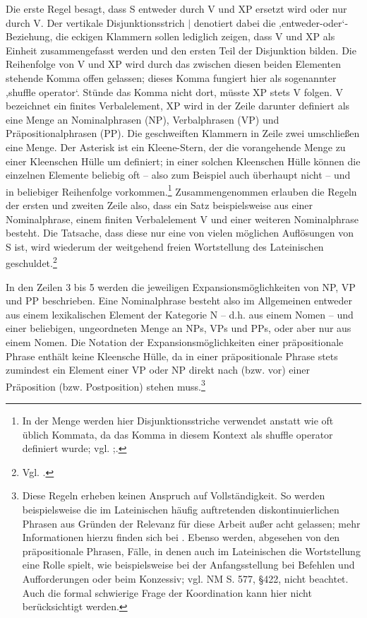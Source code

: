 \documentclass[12pt,a4paper]{article}
\begin{document}
Die erste Regel besagt, dass S entweder durch V und XP ersetzt wird oder nur durch V. Der vertikale Disjunktionsstrich $\mid$ denotiert dabei die ,entweder-oder‘-Beziehung, die eckigen Klammern sollen lediglich zeigen, dass V und XP als Einheit zusammengefasst werden und den ersten Teil der Disjunktion bilden. Die Reihenfolge von V und XP wird durch das zwischen diesen beiden Elementen stehende Komma offen gelassen; dieses Komma fungiert hier als sogenannter ,shuffle operator‘. Stünde das Komma nicht dort, müsste XP stets V folgen. V bezeichnet ein finites Verbalelement, XP wird in der Zeile darunter definiert als eine Menge an Nominalphrasen (NP), Verbalphrasen (VP) und Präpositionalphrasen (PP). Die geschweiften Klammern in Zeile zwei umschließen eine Menge. Der Asterisk ist ein Kleene-Stern, der die vorangehende Menge zu einer Kleenschen Hülle um definiert; in einer solchen Kleenschen Hülle können die einzelnen Elemente beliebig oft -- also zum Beispiel auch überhaupt nicht -- und in beliebiger Reihenfolge vorkommen.\footnote{In der Menge werden hier Disjunktionsstriche verwendet anstatt wie oft üblich Kommata, da das Komma in diesem Kontext als shuffle operator definiert wurde; vgl. \cite[26]{Skript};\cite[7??14??]{Snijders}.} Zusammengenommen erlauben die Regeln der ersten und zweiten Zeile also, dass ein Satz beispielsweise aus einer Nominalphrase, einem finiten Verbalelement V und einer weiteren Nominalphrase besteht. Die Tatsache, dass diese nur eine von vielen möglichen Auflösungen von S ist, wird wiederum der weitgehend freien Wortstellung des Lateinischen geschuldet.\footnote{Vgl. \cite[19]{Rohrer}.}

In den Zeilen 3 bis 5 werden die jeweiligen Expansionsmöglichkeiten von NP, VP und PP beschrieben. Eine Nominalphrase besteht also im Allgemeinen entweder aus einem lexikalischen Element der Kategorie N – d.h. aus einem Nomen -- und einer beliebigen, ungeordneten Menge an NPs, VPs und PPs, oder aber nur aus einem Nomen.  Die Notation der Expansionsmöglichkeiten einer präpositionale Phrase enthält keine Kleensche Hülle, da in einer präpositionale Phrase stets zumindest ein Element einer VP oder NP direkt nach (bzw. vor) einer Präposition (bzw. Postposition) stehen muss.\footnote{Diese Regeln erheben keinen Anspruch auf Vollständigkeit. So werden beispielsweise die im Lateinischen häufig auftretenden diskontinuierlichen Phrasen aus Gründen der Relevanz für diese Arbeit außer acht gelassen; mehr Informationen hierzu finden sich bei \cite{Snijders}. Ebenso werden, abgesehen von den präpositionale Phrasen, Fälle, in denen auch im Lateinischen die Wortstellung eine Rolle spielt, wie beispielsweise bei der Anfangsstellung bei Befehlen und Aufforderungen oder beim Konzessiv; vgl. NM S. 577, §422, nicht beachtet. Auch die formal schwierige Frage der Koordination kann hier nicht berücksichtigt werden.}
\end{document}
